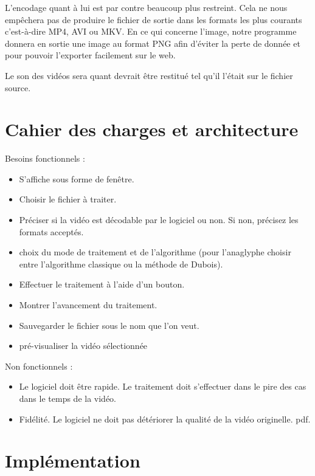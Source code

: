\documentclass[10pt,a4paper]{article}
\begin{document}
L'encodage quant à lui est par contre beaucoup plus restreint. Cela ne nous empêchera pas de produire
le fichier de sortie dans les formats les plus courants c'est-à-dire MP4, AVI ou MKV.
En ce qui concerne l'image, notre programme donnera en sortie une image au format PNG afin d'éviter la perte de donnée et
pour pouvoir l'exporter facilement sur le web.

Le son des vidéos sera quant devrait être restitué tel qu'il l'était sur le fichier source.

\section{Cahier des charges et architecture}

Besoins fonctionnels :\newline
\begin{itemize}
\item S'affiche sous forme de fenêtre.
\item Choisir le fichier à traiter.
\item Préciser si la vidéo est décodable par le logiciel ou non. Si non, précisez les formats acceptés.
\item choix du mode de traitement et de l'algorithme (pour l'anaglyphe choisir entre l'algorithme classique ou la méthode
de Dubois).
\item Effectuer le traitement à l'aide d'un bouton.
\item Montrer l'avancement du traitement.
\item Sauvegarder le fichier sous le nom que l'on veut.
\item pré-visualiser la vidéo sélectionnée\newline
\end{itemize}

Non fonctionnels :\newline
\begin{itemize}
\item Le logiciel doit être rapide. Le traitement doit s'effectuer dans le pire des cas dans le temps de la vidéo.
\item Fidélité. Le logiciel ne doit pas détériorer la qualité de la vidéo originelle.
pdf.\newline
\end{itemize}



\section{Implémentation}
\end{document}
